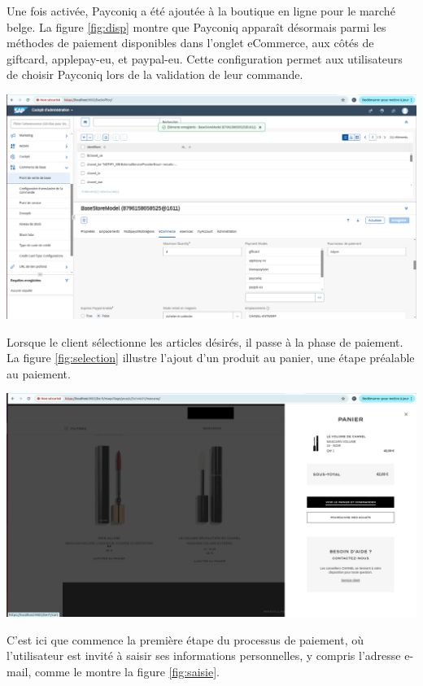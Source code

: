 Une fois activée, Payconiq a été ajoutée à la boutique en ligne pour le marché belge. La figure \ref{fig:disp} montre que Payconiq apparaît désormais parmi les méthodes de paiement disponibles dans l'onglet eCommerce, aux côtés de giftcard, applepay-eu, et paypal-eu. Cette configuration permet aux utilisateurs de choisir Payconiq lors de la validation de leur commande.
\begin{center}
    \centering
    \includegraphics[width=19cm]{Figures/Screens/activation du payconiq pour belge.png}
    \label{fig:disp}
\end{center}
Lorsque le client sélectionne les articles désirés, il passe à la phase de paiement. La figure \ref{fig:selection} illustre l'ajout d'un produit au panier, une étape préalable au paiement.
\begin{center}
    \centering
    \includegraphics[width=19cm]{Figures/Screens/ajouter un produit au panier.png}
    \label{fig:selection}
\end{center}
C'est ici que commence la première étape du processus de paiement, où l'utilisateur est invité à saisir ses informations personnelles, y compris l'adresse e-mail, comme le montre la figure \ref{fig:saisie}.
